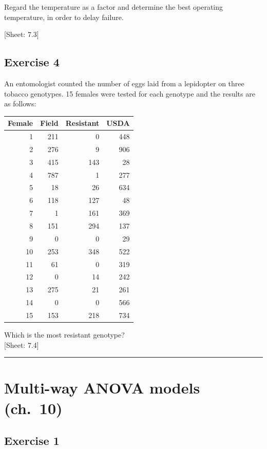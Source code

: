 \documentclass[a4paper,12pt,oneside]{book}
\begin{document}
Regard the temperature as a factor and determine the best operating temperature, in order to delay failure.

{[}Sheet: 7.3{]}

\hypertarget{exercise-4-3}{%
\subsection{Exercise 4}\label{exercise-4-3}}

An entomologist counted the number of eggs laid from a lepidopter on three tobacco genotypes. 15 females were tested for each genotype and the results are as follows:

\begin{longtable}[]{@{}rrrr@{}}
\toprule()
Female & Field & Resistant & USDA \\
\midrule()
\endhead
1 & 211 & 0 & 448 \\
2 & 276 & 9 & 906 \\
3 & 415 & 143 & 28 \\
4 & 787 & 1 & 277 \\
5 & 18 & 26 & 634 \\
6 & 118 & 127 & 48 \\
7 & 1 & 161 & 369 \\
8 & 151 & 294 & 137 \\
9 & 0 & 0 & 29 \\
10 & 253 & 348 & 522 \\
11 & 61 & 0 & 319 \\
12 & 0 & 14 & 242 \\
13 & 275 & 21 & 261 \\
14 & 0 & 0 & 566 \\
15 & 153 & 218 & 734 \\
\bottomrule()
\end{longtable}

Which is the most resistant genotype?\\
{[}Sheet: 7.4{]}

\begin{center}\rule{0.5\linewidth}{0.5pt}\end{center}

\hypertarget{multi-way-anova-models-ch.-10}{%
\section{Multi-way ANOVA models (ch.~10)}\label{multi-way-anova-models-ch.-10}}

\hypertarget{exercise-1-6}{%
\subsection{Exercise 1}\label{exercise-1-6}}
\end{document}
